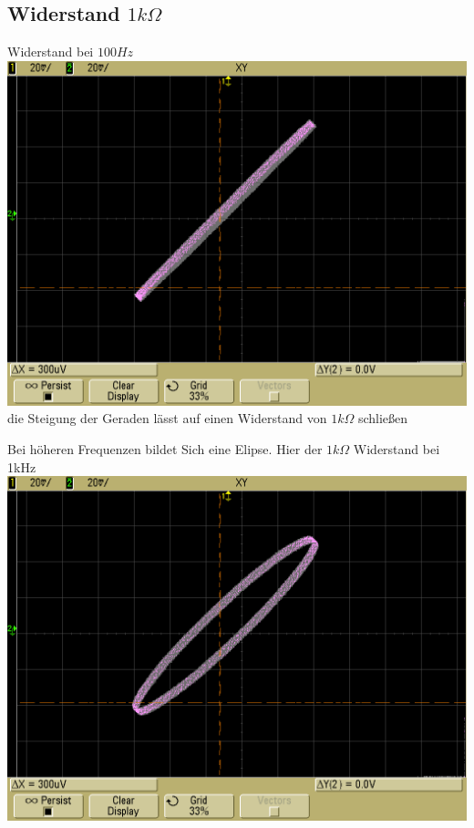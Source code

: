 \documentclass[compress,11pt]{beamer}
\begin{document}
\subsection{Widerstand $1k\Omega$}
\begin{frame}
Widerstand bei $100Hz$
\includegraphics[width=\textwidth]{images/scope_5}
die Steigung der Geraden lässt auf einen Widerstand von $1k\Omega$ schließen
\end{frame}
\begin{frame}
Bei höheren Frequenzen bildet Sich eine Elipse. Hier der $1k\Omega$ Widerstand bei 1kHz
\includegraphics[width=\textwidth]{images/scope_6}
\end{frame}
\end{document}
